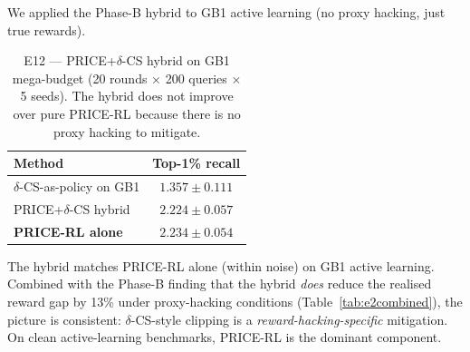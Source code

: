 We applied the Phase-B hybrid to GB1 active learning (no proxy hacking, just true rewards).

\begin{table}[t]
\centering
\caption{E12 --- PRICE+$\delta$-CS hybrid on GB1 mega-budget (20 rounds \(\times\) 200 queries \(\times\) 5 seeds). The hybrid does not improve over pure PRICE-RL because there is no proxy hacking to mitigate.}
\label{tab:e12}
\begin{tabular}{lc}
\toprule
Method & Top-1\% recall \\
\midrule
$\delta$-CS-as-policy on GB1                       & $1.357 \pm 0.111$ \\
PRICE+$\delta$-CS hybrid                            & $2.224 \pm 0.057$ \\
\textbf{PRICE-RL alone}                             & $\mathbf{2.234 \pm 0.054}$ \\
\bottomrule
\end{tabular}
\end{table}

The hybrid matches PRICE-RL alone (within noise) on GB1 active learning. Combined with the Phase-B finding that the hybrid \emph{does} reduce the realised reward gap by 13\% under proxy-hacking conditions (Table~\ref{tab:e2combined}), the picture is consistent: $\delta$-CS-style clipping is a \emph{reward-hacking-specific} mitigation. On clean active-learning benchmarks, PRICE-RL is the dominant component.
